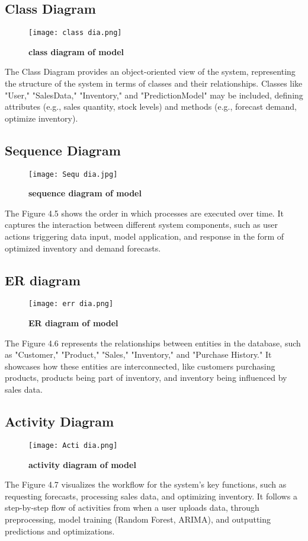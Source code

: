 \documentclass[10pt]{report}
\begin{document}
\begin{center}
\subsection{Class Diagram}
\begin{figure}[H]
 \centering
 \texttt{[image: class dia.png]}
 \caption{\textbf{class diagram of model}}
\end{figure}
The Class Diagram provides an object-oriented view of the system, representing the structure of the system in terms of classes and their relationships. Classes like "User," "SalesData," "Inventory," and "PredictionModel" may be included, defining attributes (e.g., sales quantity, stock levels) and methods (e.g., forecast demand, optimize inventory).
\subsection{Sequence Diagram}
\begin{figure}[H]
 \centering
 \texttt{[image: Sequ dia.jpg]}
 \caption{\textbf{sequence diagram of model}}
\end{figure}
The Figure 4.5 shows the order in which processes are executed over time. It captures the interaction between different system components, such as user actions triggering data input, model application, and response in the form of optimized inventory and demand forecasts.
\subsection{ER diagram}
\begin{figure}[H]
 \centering
 \texttt{[image: err dia.png]}
 \caption{\textbf{ER diagram of model}}
\end{figure}
The Figure 4.6 represents the relationships between entities in the database, such as "Customer," "Product," "Sales," "Inventory," and "Purchase History." It showcases how these entities are interconnected, like customers purchasing products, products being part of inventory, and inventory being influenced by sales data.

\subsection{Activity Diagram}
\begin{figure}[H]
 \centering
 \texttt{[image: Acti dia.png]}
 \caption{\textbf{activity diagram of model}}
\end{figure}
The Figure 4.7 visualizes the workflow for the system's key functions, such as requesting forecasts, processing sales data, and optimizing inventory. It follows a step-by-step flow of activities from when a user uploads data, through preprocessing, model training (Random Forest, ARIMA), and outputting predictions and optimizations.


\end{center}
\end{document}
